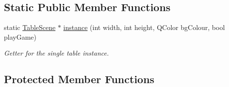 \subsection*{Static Public Member Functions}
\begin{DoxyCompactItemize}
\item 
static \hyperlink{class_table_scene}{Table\+Scene} $\ast$ \hyperlink{class_table_scene_a9c9586a5d3a44e6924724b08af889cc5}{instance} (int width, int height, Q\+Color bg\+Colour, bool play\+Game)
\begin{DoxyCompactList}\small\item\em Getter for the single table instance. \end{DoxyCompactList}\end{DoxyCompactItemize}
\subsection*{Protected Member Functions}
